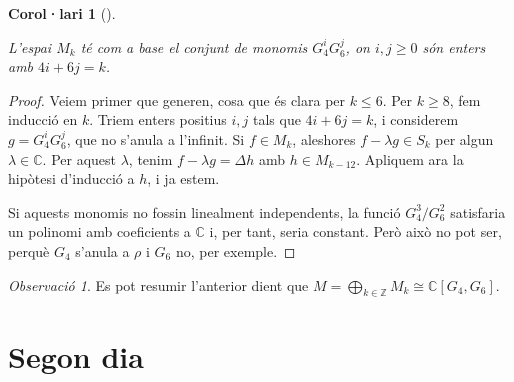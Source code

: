 \documentclass[
  letterpaper,
  DIV=11,
  numbers=noendperiod]{scrreprt}
\theoremstyle{plain}
\theoremstyle{plain}
\newtheorem{corollary}{Corol·lari}[chapter]
\theoremstyle{definition}
\theoremstyle{plain}
\theoremstyle{plain}
\theoremstyle{definition}
\theoremstyle{remark}
\newtheorem{refremark}{Observació}[chapter]
\begin{document}
\begin{corollary}[]\protect\hypertarget{cor-}{}\label{cor-}

L'espai \(M_k\) té com a base el conjunt de monomis \(G_4^iG_6^j\), on
\(i,j\geq 0\) són enters amb \(4i+6j=k\).

\end{corollary}

\begin{proof}
Veiem primer que generen, cosa que és clara per \(k\leq 6\). Per
\(k\geq 8\), fem inducció en \(k\). Triem enters positius \(i,j\) tals
que \(4i+6j=k\), i considerem \(g =G_4^iG_6^j\), que no s'anula a
l'infinit. Si \(f\in M_k\), aleshores \(f-\lambda g\in S_k\) per algun
\(\lambda\in\mathbb{C}\). Per aquest \(\lambda\), tenim
\(f-\lambda g = \Delta h\) amb \(h\in M_{k-12}\). Apliquem ara la
hipòtesi d'inducció a \(h\), i ja estem.

Si aquests monomis no fossin linealment independents, la funció
\(G_4^3/G_6^2\) satisfaria un polinomi amb coeficients a \(\mathbb{C}\)
i, per tant, seria constant. Però això no pot ser, perquè \(G_4\)
s'anula a \(\rho\) i \(G_6\) no, per exemple.
\end{proof}

\begin{refremark}
Es pot resumir l'anterior dient que
\(M=\bigoplus_{k\in\mathbb{Z}} M_k \cong \mathbb{C}[G_4,G_6]\).

\label{rem-}

\end{refremark}


\chapter{Segon dia}\label{segon-dia}

\providecommand{\QQ}{\mathbb{Q}}
\providecommand{\ZZ}{\mathbb{Z}}
\providecommand{\RR}{\mathbb{R}}
\providecommand{\FF}{\mathbb{F}}
\providecommand{\CC}{\mathbb{C}}
\providecommand{\HH}{\mathbb{H}}

\providecommand{\fX}{\mathfrak{X}}

\providecommand{\SL}{\operatorname{SL}}
\providecommand{\GL}{\operatorname{GL}}
\providecommand{\PSL}{\operatorname{PSL}}
\providecommand{\PGL}{\operatorname{PGL}}
\end{document}
